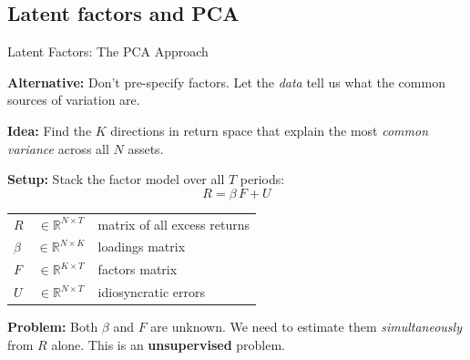\documentclass[aspectratio=169]{beamer}
\newcommand{\R}{\mathbb{R}}
\begin{document}
\subsection{Latent factors and PCA}
%
\begin{frame}{Latent Factors: The PCA Approach}

\textbf{Alternative:} Don't pre-specify factors. Let the \emph{data} tell us what the common sources of variation are.

\vspace{0.5em}
\textbf{Idea:} Find the $K$ directions in return space that explain the most \emph{common variance} across all $N$ assets.

\vspace{0.7em}
\textbf{Setup:} Stack the factor model over all $T$ periods:
\[
R = \beta\, F + U
\]

\begin{center}
\renewcommand{\arraystretch}{1.2}
\begin{tabular}{lcl}
$R$ & $\in \R^{N \times T}$ & matrix of all excess returns \\
$\beta$ & $\in \R^{N \times K}$ & loadings matrix \\
$F$ & $\in \R^{K \times T}$ & factors matrix \\
$U$ & $\in \R^{N \times T}$ & idiosyncratic errors \\
\end{tabular}
\end{center}

\vspace{0.5em}
\textbf{Problem:} Both $\beta$ and $F$ are unknown. We need to estimate them \emph{simultaneously} from $R$ alone. This is an \textbf{unsupervised} problem.
\end{frame}
%
%
\end{document}
